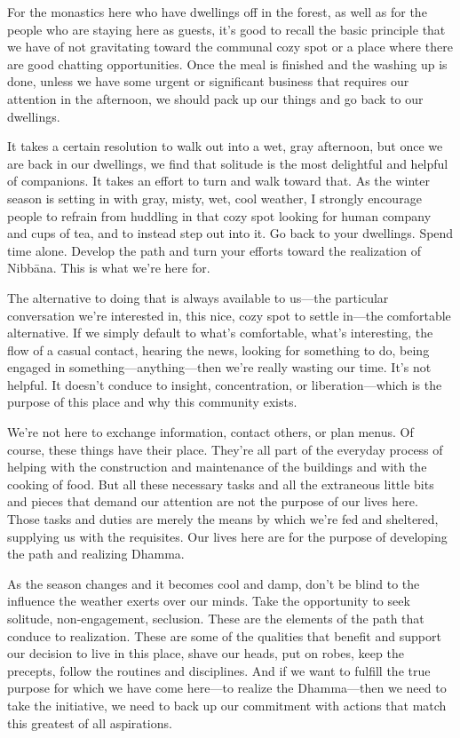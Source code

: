 For the monastics here who have dwellings off in the forest, as well as 
for the people who are staying here as guests, it's good to recall the 
basic principle that we have of not gravitating toward the communal 
cozy spot or a place where there are good chatting opportunities. Once 
the meal is finished and the washing up is done, unless we have some 
urgent or significant business that requires our attention in the 
afternoon, we should pack up our things and go back to our dwellings.

It takes a certain resolution to walk out into a wet, gray afternoon, 
but once we are back in our dwellings, we find that solitude is the 
most delightful and helpful of companions. It takes an effort to turn 
and walk toward that. As the winter season is setting in with gray, 
misty, wet, cool weather, I strongly encourage people to refrain from 
huddling in that cozy spot looking for human company and cups of tea, 
and to instead step out into it. Go back to your dwellings. Spend time 
alone. Develop the path and turn your efforts toward the realization of 
Nibbāna. This is what we're here for.

The alternative to doing that is always available to us---the 
particular conversation we're interested in, this nice, cozy spot to 
settle in---the comfortable alternative. If we simply default to what's 
comfortable, what's interesting, the flow of a casual contact, hearing 
the news, looking for something to do, being engaged in 
something---anything---then we're really wasting our time. It's not 
helpful. It doesn't conduce to insight, concentration, or 
liberation---which is the purpose of this place and why this community 
exists.

We're not here to exchange information, contact others, or plan menus. 
Of course, these things have their place. They're all part of the 
everyday process of helping with the construction and maintenance of 
the buildings and with the cooking of food. But all these necessary 
tasks and all the extraneous little bits and pieces that demand our 
attention are not the purpose of our lives here. Those tasks and duties 
are merely the means by which we're fed and sheltered, supplying us 
with the requisites. Our lives here are for the purpose of developing 
the path and realizing Dhamma.

As the season changes and it becomes cool and damp, don't be blind to 
the influence the weather exerts over our minds. Take the opportunity 
to seek solitude, non-engagement, seclusion. These are the elements of 
the path that conduce to realization. These are some of the qualities 
that benefit and support our decision to live in this place, shave our 
heads, put on robes, keep the precepts, follow the routines and 
disciplines. And if we want to fulfill the true purpose for which we 
have come here---to realize the Dhamma---then we need to take the 
initiative, we need to back up our commitment with actions that match 
this greatest of all aspirations.

